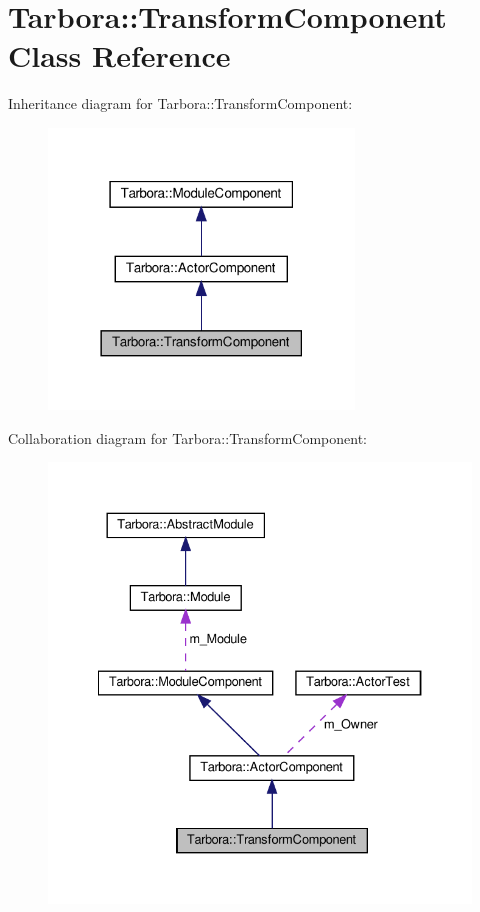 \hypertarget{classTarbora_1_1TransformComponent}{}\section{Tarbora\+:\+:Transform\+Component Class Reference}
\label{classTarbora_1_1TransformComponent}


Inheritance diagram for Tarbora\+:\+:Transform\+Component\+:
\nopagebreak
\begin{figure}[H]
\begin{center}
\leavevmode
\includegraphics[width=230pt]{classTarbora_1_1TransformComponent__inherit__graph}
\end{center}
\end{figure}


Collaboration diagram for Tarbora\+:\+:Transform\+Component\+:
\nopagebreak
\begin{figure}[H]
\begin{center}
\leavevmode
\includegraphics[width=334pt]{classTarbora_1_1TransformComponent__coll__graph}
\end{center}
\end{figure}
